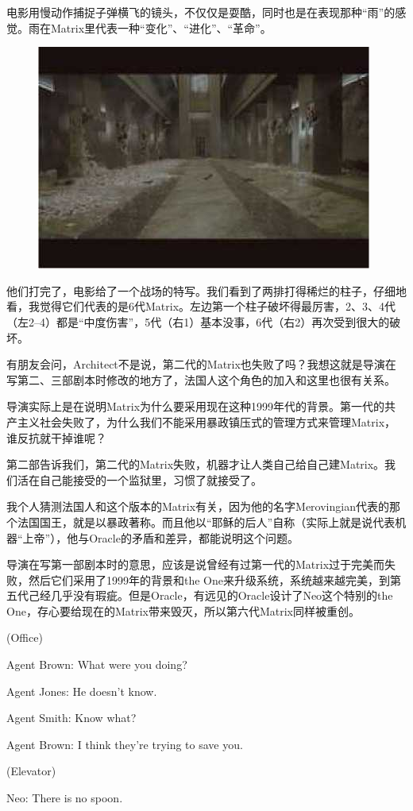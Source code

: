 \documentclass{ctexart}
\newenvironment{myquote}{\color{green} \setlength{\leftskip}{6em} \setlength{\rightskip}{4em} \setlength{\parindent}{-2em}}{\par}
\begin{document}
电影用慢动作捕捉子弹横飞的镜头，不仅仅是耍酷，同时也是在表现那种“雨”的感觉。雨在Matrix里代表一种“变化”、“进化”、“革命”。

\begin{figure}[htb]
\centering
\includegraphics[width=0.5\linewidth]{fig/read_Matrix-64}
\end{figure}

他们打完了，电影给了一个战场的特写。我们看到了两排打得稀烂的柱子，仔细地看，我觉得它们代表的是6代Matrix。左边第一个柱子破坏得最厉害，2、3、4代（左2--4）都是“中度伤害”，5代（右1）基本没事，6代（右2）再次受到很大的破坏。

有朋友会问，Architect不是说，第二代的Matrix也失败了吗？我想这就是导演在写第二、三部剧本时修改的地方了，法国人这个角色的加入和这里也很有关系。

导演实际上是在说明Matrix为什么要采用现在这种1999年代的背景。第一代的共产主义社会失败了，为什么我们不能采用暴政镇压式的管理方式来管理Matrix，谁反抗就干掉谁呢？

第二部告诉我们，第二代的Matrix失败，机器才让人类自己给自己建Matrix。我们活在自己能接受的一个监狱里，习惯了就接受了。

我个人猜测法国人和这个版本的Matrix有关，因为他的名字Merovingian代表的那个法国国王，就是以暴政著称。而且他以“耶稣的后人”自称（实际上就是说代表机器“上帝”），他与Oracle的矛盾和差异，都能说明这个问题。

导演在写第一部剧本时的意思，应该是说曾经有过第一代的Matrix过于完美而失败，然后它们采用了1999年的背景和the One来升级系统，系统越来越完美，到第五代己经几乎没有瑕疵。但是Oracle，有远见的Oracle设计了Neo这个特别的the One，存心要给现在的Matrix带来毁灭，所以第六代Matrix同样被重创。

\begin{myquote}
(Office)

Agent Brown: What were you doing?

Agent Jones: He doesn't know.

Agent Smith: Know what?

Agent Brown: I think they're trying to save you.

(Elevator)

Neo: There is no spoon.
\end{myquote}
\end{document}
